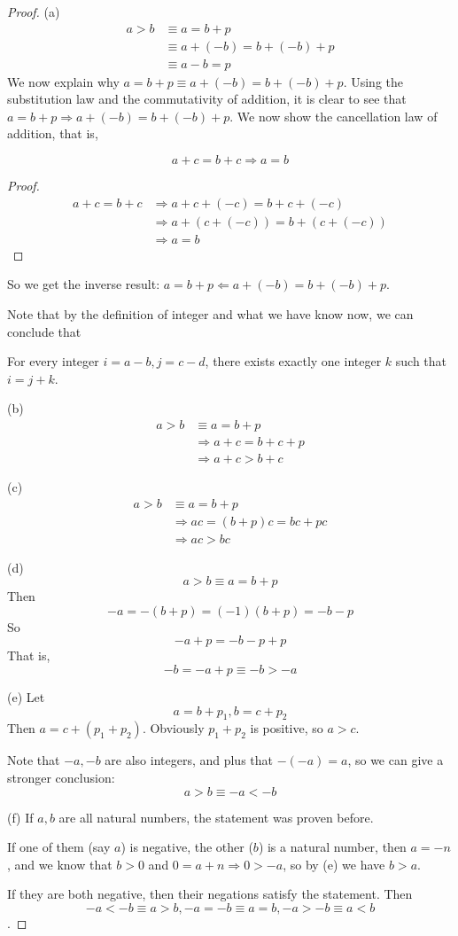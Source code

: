 \begin{proof}
(a)
\begin{align*}
a>b 
&\equiv a = b+p \\
&\equiv a+(-b) = b + (-b) + p  \tag{See the following explanation} \\
&\equiv a-b = p
\end{align*}
We now explain why $a = b+p \equiv a+(-b) = b + (-b) + p$. Using the substitution law and the 
commutativity of addition, it is clear to see that $a = b+p \Longrightarrow a+(-b) = b + (-b) + p$. We now 
show the cancellation law of addition, that is,
\begin{lem}
\[
a+c = b+c \Longrightarrow a = b
\]
\end{lem}
\begin{proof}
\begin{align*}
a+c=b+c
&\Longrightarrow a+c+(-c) = b+c+(-c) \\
&\Longrightarrow a+(c+(-c)) = b + (c+(-c)) \\
&\Longrightarrow a=b
\end{align*}
\end{proof}

So we get the inverse result: $a = b+p \Longleftarrow a+(-b) = b + (-b) + p$.

Note that by the definition of integer and what we have know now, we can conclude that 
\begin{lem}
For every integer 
$i = a - b, j = c - d$, there exists exactly one integer $k$ such that $i = j+k$.
\end{lem}

(b)
\begin{align*}
a>b
&\equiv a = b + p \\
&\Longrightarrow a+c = b+c+p \\
&\Longrightarrow a+c>b+c
\end{align*}

(c)
\begin{align*}
a>b
&\equiv a=b+p \\
&\Longrightarrow ac = (b+p)c = bc + pc \\
&\Longrightarrow ac > bc \tag{$pc > 0$ by Lemma 2.3.3}
\end{align*}

(d)
\[
a>b \equiv a = b+p
\]
Then
\[
-a = -(b+p) = (-1)(b+p) = -b - p
\]
So
\[
-a+p=-b-p+p
\]
That is,
\[
-b=-a+p \equiv -b>-a
\]

(e)
Let
\[
a = b+p_1,b=c+p_2
\]
Then $a = c+(p_1+p_2)$. Obviously $p_1+p_2$ is positive, so $a>c$.

Note that $-a,-b$ are also integers, and plus that $-(-a)=a$, so we can give a stronger conclusion:
\[
a>b \equiv -a<-b
\]

(f)
If $a,b$ are all natural numbers, the statement was proven before. 

If one of them (say $a$) is negative, 
the other ($b$) is a natural number, then $a=-n$, and we know that $b>0$ and 
$0 = a+n \Longrightarrow 0 >-a$, so by (e) we have $b>a$.

If they are both negative, then their negations satisfy the statement. Then
\[
-a<-b \equiv a>b, -a=-b \equiv a=b, -a>-b \equiv a<b
\].
\end{proof}

